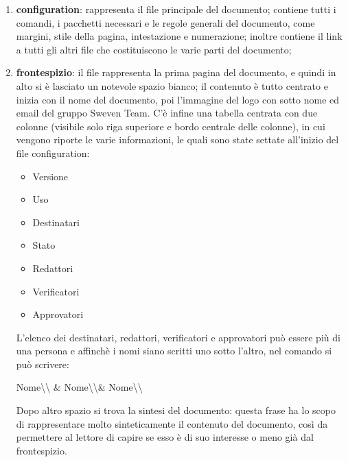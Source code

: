 \begin{enumerate}
    \item \textbf{configuration}:
            rappresenta il file principale del documento; contiene tutti i comandi, 
            i pacchetti necessari e le regole generali del documento, come 
            margini, stile della pagina, intestazione e numerazione; 
            inoltre contiene il link a tutti gli altri file che costituiscono le 
            varie parti del documento;

    \item \textbf{frontespizio}:
            il file rappresenta la prima pagina del documento, e quindi in alto si
            è lasciato un notevole spazio bianco; il contenuto è tutto centrato e 
            inizia con il nome del documento, poi l'immagine del logo con sotto 
            nome ed email del gruppo Sweven Team. C'è infine una tabella centrata 
            con due colonne (visibile solo riga superiore e bordo centrale delle colonne), 
            in cui vengono riporte le varie informazioni, le quali sono state settate all'inizio 
            del file configuration:
            \begin{itemize}
                \item Versione
                \item Uso
                \item Destinatari
                \item Stato
                \item Redattori
                \item Verificatori
                \item Approvatori
            \end{itemize}
            L'elenco dei destinatari, redattori, verificatori e approvatori 
            può essere più di una persona e affinchè i nomi siano scritti uno sotto 
            l'altro, nel comando si può scrivere: 
            \begin{center}
            	Nome\textbackslash\textbackslash 
            	\& Nome\textbackslash\textbackslash \& Nome\textbackslash\textbackslash
            \end{center}
            Dopo altro spazio si trova la sintesi del documento: questa frase
            ha lo scopo di rappresentare molto sinteticamente il contenuto del documento, 
            così da permettere al lettore di capire se esso è di suo interesse o meno già dal frontespizio.
    

\end{enumerate}
